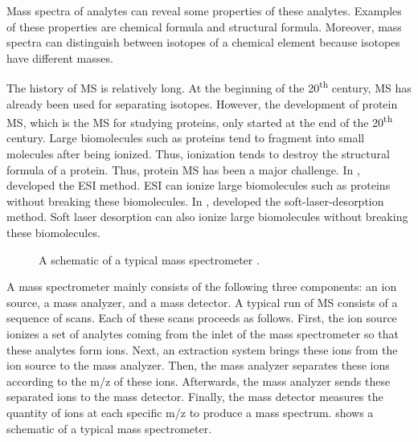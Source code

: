 Mass spectra of analytes can reveal some properties of these analytes. 
Examples of these properties are chemical formula and structural formula. %
Moreover, mass spectra can distinguish between isotopes of a chemical element because isotopes have different masses. 

The history of \Gls{MS} is relatively long. 
At the beginning of the 20\textsuperscript{th} century, \gls{MS} has already been used for separating isotopes.
However, the development of protein \gls{MS}, which is the \gls{MS} for studying proteins, only started at the end of the 20\textsuperscript{th} century. 
Large biomolecules such as proteins tend to fragment into small molecules after being ionized.
Thus, ionization tends to destroy the structural formula of a protein.
Thus, protein \gls{MS} has been a major challenge.
In \citeyear{yamashita1984electrospray}, \citet{yamashita1984electrospray} developed the \gls{ESI} method.
\Gls{ESI} can ionize large biomolecules such as proteins without breaking these biomolecules. 
In \citeyear{tanaka1988protein}, \citet{tanaka1988protein} developed the soft-laser-desorption method.
Soft laser desorption can also ionize large biomolecules without breaking these biomolecules.

\begin{figure}
\caption[
	A schematic of a typical mass spectrometer \cite{eidhammer2008computational}.]{
	A schematic of a typical mass spectrometer \cite{eidhammer2008computational}.
	\label{fig:fund2:ms1-schematics}}
\end{figure} 
A mass spectrometer mainly consists of the following three components: an ion source, a mass analyzer, and a mass detector. 
A typical run of \gls{MS} consists of a sequence of scans.
Each of these scans proceeds as follows.
First, the ion source ionizes a set of analytes coming from the inlet of the mass spectrometer so that these analytes form ions.{}
Next, an extraction system brings these ions from the ion source to the mass analyzer.{} 
Then, the mass analyzer separates these ions according to the \gls{m/z} of these ions.
Afterwards, the mass analyzer sends these separated ions to the mass detector.
Finally, the mass detector measures the quantity of ions at each specific \gls{m/z} to produce a mass spectrum.
 shows a schematic of a typical mass spectrometer.
 
